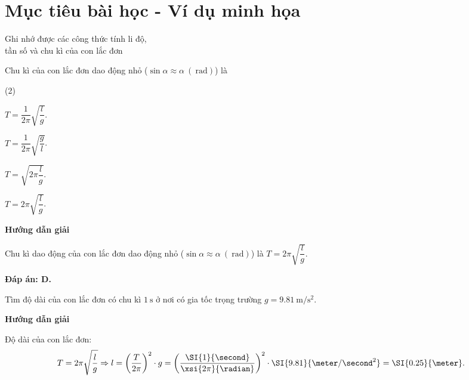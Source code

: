 \section{Mục tiêu bài học - Ví dụ minh họa}
\begin{dang}{Ghi nhớ được các công thức tính li độ,\\ tần số và chu kì của con lắc đơn}
	{
		Chu kì của con lắc đơn dao động nhỏ ($\sin \alpha \approx \alpha\ (\SI{}{\radian})$) là
		\begin{mcq}(2)
			\item $T=\dfrac {1}{2\pi} \sqrt {\dfrac{l}{g}}$.
			\item $T=\dfrac {1}{2\pi} \sqrt {\dfrac{g}{l}}$.
			\item $T=\sqrt {2\pi \dfrac {l}{g}}$.
			\item $T=2\pi \sqrt {\dfrac{l}{g}}$.
		\end{mcq}
	}
	{\begin{center}
			\textbf{Hướng dẫn giải}
		\end{center}
		
		Chu kì dao động của con lắc đơn dao động nhỏ ($\sin \alpha \approx \alpha\ (\SI{}{\radian})$) là $T=2\pi \sqrt {\dfrac{l}{g}}$.
		
		\textbf{Đáp án: D.}
	}
	{
		Tìm độ dài của con lắc đơn có chu kì $\SI{1}{\second}$ ở nơi có gia tốc trọng trường $g=\SI{9.81}{\meter / \second ^2}$.
	}
	{
		\begin{center}
			\textbf{Hướng dẫn giải}
		\end{center}
		
		Độ dài của con lắc đơn: $$T=2\pi \sqrt {\dfrac{l}{g}} \Rightarrow l=\left(\dfrac {T}{2\pi}\right)^2 \cdot g = \left(\dfrac {\SI{1}{\second}}{\xsi{2\pi}{\radian}}\right)^2 \cdot \SI{9.81}{\meter / \second^2} = \SI{0.25}{\meter}.$$
	}
\end{dang}
